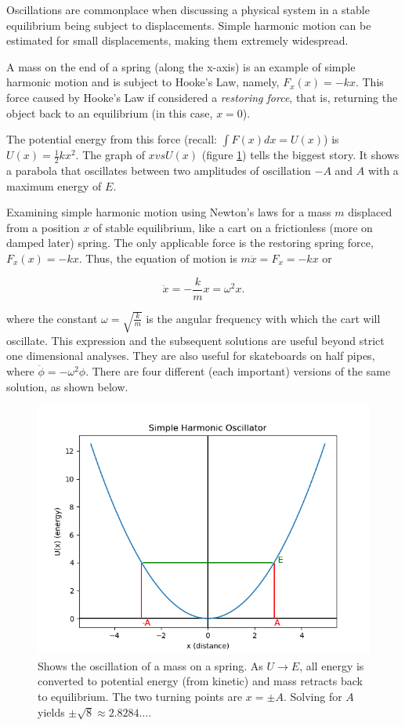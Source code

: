 
Oscillations are commonplace when discussing a physical system in a stable equilibrium being subject to displacements. Simple harmonic motion can be estimated for small displacements, making them extremely widespread.

A mass on the end of a spring (along the x-axis) is an example of simple harmonic motion and is subject to Hooke's Law, namely, $F_x(x) = -kx$. This force caused by Hooke's Law if considered a {\itshape restoring force}, that is, returning the object back to an equilibrium (in this case, $x=0$).

The potential energy from this force (recall: $\int F(x) dx = U(x)$) is $U(x) = \frac{1}{2}kx^2$. The graph of $x vs U(x)$ (figure \ref{fig:SHO_xvsE}) tells the biggest story. It shows a parabola that oscillates between two amplitudes of oscillation $-A$ and $A$ with a maximum energy of $E$.

Examining simple harmonic motion using Newton's laws for a mass $m$ displaced from a position $x$ of stable equilibrium, like a cart on a frictionless (more on damped later) spring. The only applicable force is the restoring spring force, $F_x(x) = -kx$. Thus, the equation of motion is $m \ddot{x} = F_x = -kx$ or

\begin{equation*}
    \ddot{x} = -\frac{k}{m}x = \omega^2x.
\end{equation*}

\noindent where the constant $\omega = \sqrt{\frac{k}{m}}$ is the angular frequency with which the cart will oscillate. This expression and the subsequent solutions are useful beyond strict one dimensional analyses. They are also useful for skateboards on half pipes, where $\ddot{\phi} = -\omega^2\phi$. There are four different (each important) versions of the same solution, as shown below.

\begin{figure}[h]
    \centering
    \includegraphics[width=13cm]{Classical_Mechanics/2.10-SHO/SHO_xvsE.png}
    \caption{Shows the oscillation of a mass on a spring. As $U \rightarrow E$, all energy is converted to potential energy (from kinetic) and mass retracts back to equilibrium. The two turning points are $x=\pm A$. Solving for $A$ yields $\pm \sqrt{8} \approx 2.8284 \dotsc$.}
    \label{fig:SHO_xvsE}
\end{figure}


